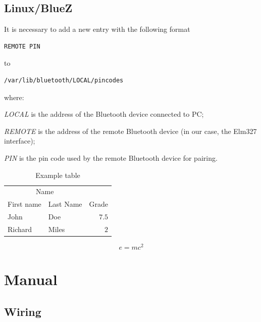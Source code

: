 \documentclass[twoside]{article}
\begin{document}
\begin{multicols}{2}
\subsection{Linux/BlueZ}

It is necessary to add a new entry with the following format
\begin{lstlisting}[language=bash]
REMOTE PIN
\end{lstlisting}
to
\begin{lstlisting}[language=bash]
/var/lib/bluetooth/LOCAL/pincodes
\end{lstlisting}
where:
\begin{compactitem}
\item \emph{LOCAL} is the address of the Bluetooth device connected to PC;
\item \emph{REMOTE} is the address of the remote Bluetooth device (in our case, the Elm327 interface);
\item \emph{PIN} is the pin code used by the remote Bluetooth device for pairing.
\end{compactitem}

\begin{table}[H]
\caption{Example table}
\centering
\begin{tabular}{llr}
\toprule
\multicolumn{2}{c}{Name} \\
\cmidrule(r){1-2}
First name & Last Name & Grade \\
\midrule
John & Doe & $7.5$ \\
Richard & Miles & $2$ \\
\bottomrule
\end{tabular}
\end{table}

\lipsum[5] %

\begin{equation}
\label{eq:emc}
e = mc^2
\end{equation}

\lipsum[6] %


\section{Manual}

\subsection{Wiring}


\end{multicols}
\end{document}
